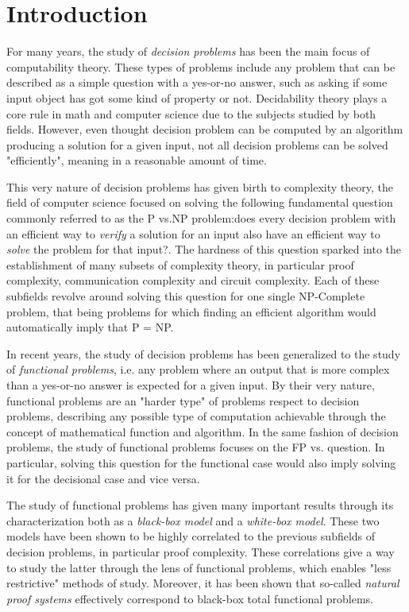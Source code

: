\hypersetup{colorlinks=true, linkcolor=blue, citecolor=red}

\chapter{Introduction} \label{chap:introduction}

For many years, the study of \textit{decision problems} has been the main focus of computability theory. These types of problems include any problem that can be described as a simple question with a yes-or-no answer, such as asking if some input object has got some kind of property or not. Decidability theory plays a core rule in math and computer science due to the subjects studied by both fields. However, even thought decision problem can be computed by an algorithm producing a solution for a given input, not all decision problems can be solved "efficiently", meaning in a reasonable amount of time.

This very nature of decision problems has given birth to complexity theory, the field of computer science focused on solving the following fundamental question commonly referred to as the \textsf{P} vs.\@ \textsf{NP} problem:\@ \flqq does every decision problem with an efficient way to \textit{verify} a solution for an input also have an efficient way to \textit{solve} the problem for that input?\frqq. The hardness of this question sparked into the establishment of many subsets of complexity theory, in particular proof complexity, communication complexity and circuit complexity. Each of these subfields revolve around solving this question for one single \textsf{NP}-Complete problem, that being problems for which finding an efficient algorithm would automatically imply that \textsf{P} = \textsf{NP}.

In recent years, the study of decision problems has been generalized to the study of \textit{functional problems}, i.e. any problem where an output that is more complex than a yes-or-no answer is expected for a given input. By their very nature, functional problems are an "harder type" of problems respect to decision problems, describing any possible type of computation achievable through the concept of mathematical function and algorithm. In the same fashion of decision problems, the study of functional problems focuses on the \textsf{FP} vs.\@ {} question. In particular, solving this question for the functional case would also imply solving it for the decisional case and vice versa.

The study of functional problems has given many important results through its characterization both as a \textit{black-box model} and a \textit{white-box model}. These two models have been shown to be highly correlated to the previous subfields of decision problems, in particular proof complexity. These correlations give a way to study the latter through the lens of functional problems, which enables "less restrictive" methods of study. Moreover, it has been shown that so-called \textit{natural proof systems} effectively correspond to black-box total functional problems.


